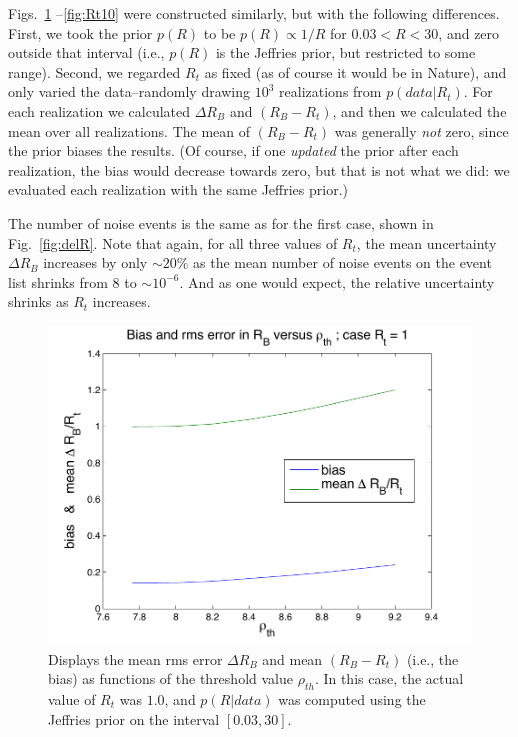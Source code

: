 \documentclass[aps,prd]{revtex4-1}
\begin{document}
Figs.~\ref{fig:Rt1} --\ref{fig:Rt10} were constructed similarly, but with the following differences.  First, we took the prior 
$p(R)$ to be $p(R) \propto 1/R$ for  $0.03 < R < 30$, and zero outside that interval (i.e., $p(R)$ is the Jeffries prior, but restricted to some range).   Second, we regarded $R_t$ as fixed (as of course it would be in Nature), and only varied the data--randomly drawing $10^3$ realizations from $p(data|R_t)$.  For each realization we calculated $\Delta R_B$ and $(R_B - R_t)$, and then we calculated the mean over all realizations.  The mean of $(R_B - R_t)$ was generally {\it not} zero, since the
prior biases the results.  (Of course, if one {\it updated} the prior after each realization, the 
bias would decrease towards zero, but that is not what we did: we evaluated each realization with the same Jeffries prior.)   

The number of noise events is the same as for the first case, shown in Fig.~\ref{fig:delR}.  Note that again, for all three values of $R_t$, the mean uncertainty $\Delta R_B$ increases by only $\sim 20\%$  as the mean number of noise events on the event list shrinks from $8$ to $\sim 10^{-6}$.  And as one would expect, the relative uncertainty shrinks as $R_t$ increases.

\begin{figure}
\includegraphics[width=\columnwidth]{Rt1}
\caption{\label{fig:Rt1} Displays the mean rms error $\Delta R_B$ and mean $(R_B - R_t)$ (i.e., the bias) as functions of the threshold value $\rho_{th}$.  In this case, the actual value of $R_t$ was $1.0$, and $p(R|data)$ was computed using the Jeffries prior on the interval $[0.03,30]$.}
\end{figure} 
\end{document}

